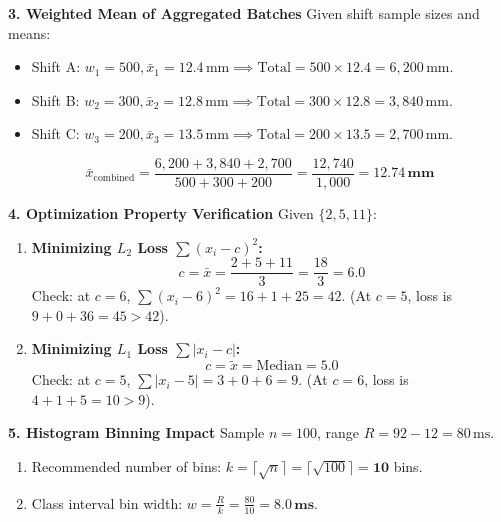 \textbf{3. Weighted Mean of Aggregated Batches}
Given shift sample sizes and means:
\begin{itemize}
    \item Shift A: $w_1 = 500, \bar{x}_1 = 12.4\,\text{mm} \implies \text{Total} = 500 \times 12.4 = 6{,}200\,\text{mm}$.
    \item Shift B: $w_2 = 300, \bar{x}_2 = 12.8\,\text{mm} \implies \text{Total} = 300 \times 12.8 = 3{,}840\,\text{mm}$.
    \item Shift C: $w_3 = 200, \bar{x}_3 = 13.5\,\text{mm} \implies \text{Total} = 200 \times 13.5 = 2{,}700\,\text{mm}$.
\end{itemize}
$$\bar{x}_{\text{combined}} = \frac{6{,}200 + 3{,}840 + 2{,}700}{500 + 300 + 200} = \frac{12{,}740}{1{,}000} = \mathbf{12.74\,\text{mm}}$$

\textbf{4. Optimization Property Verification}
Given $\{2, 5, 11\}$:
\begin{enumerate}
    \item \textbf{Minimizing $L_2$ Loss $\sum (x_i - c)^2$:}
    $$c = \bar{x} = \frac{2 + 5 + 11}{3} = \frac{18}{3} = \mathbf{6.0}$$
    Check: at $c=6$, $\sum(x_i - 6)^2 = 16 + 1 + 25 = 42$. (At $c=5$, loss is $9 + 0 + 36 = 45 > 42$).
    \item \textbf{Minimizing $L_1$ Loss $\sum |x_i - c|$:}
    $$c = \tilde{x} = \text{Median} = \mathbf{5.0}$$
    Check: at $c=5$, $\sum|x_i - 5| = 3 + 0 + 6 = 9$. (At $c=6$, loss is $4 + 1 + 5 = 10 > 9$).
\end{enumerate}

\textbf{5. Histogram Binning Impact}
Sample $n = 100$, range $R = 92 - 12 = 80\,\text{ms}$.
\begin{enumerate}
    \item Recommended number of bins: $k = \lceil\sqrt{n}\rceil = \lceil\sqrt{100}\rceil = \mathbf{10}$ bins.
    \item Class interval bin width: $w = \frac{R}{k} = \frac{80}{10} = \mathbf{8.0\,\text{ms}}$.
\end{enumerate}

